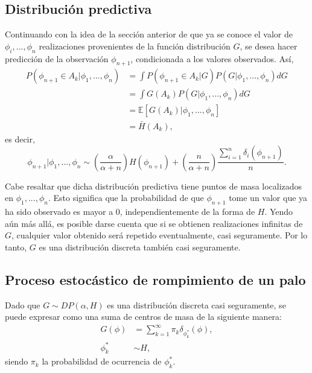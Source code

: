 \subsection{Distribuci\'on predictiva}

Continuando con la idea de la secci\'on anterior de que ya se conoce el valor de $\phi_i,...,\phi_n$ realizaciones provenientes de la funci\'on distribuci\'on $G$, se desea hacer predicci\'on de la observaci\'on $\phi_{n+1}$, condicionada a los valores observados. As\'i,
\begin{equation*}
\begin{aligned}
   P(\phi_{n+1} \in A_k|\phi_1,...,\phi_n)
   &= \int P(\phi_{n+1} \in A_k|G) P(G|\phi_1,...,\phi_n) dG \\ 
   &= \int G(A_k) P(G|\phi_1,...,\phi_n) dG \\ 
   &= \mathbb{E}[G(A_k)|\phi_1,...,\phi_n] \\
   &= \bar{H}(A_k),
\end{aligned}    
\end{equation*}
es decir, 
\begin{equation*}
    \phi_{n+1}|\phi_1,...,\phi_n \sim 
    \left(\frac{\alpha}{\alpha + n}\right)H(\phi_{n+1}) + 
    \left(\frac{n}{\alpha + n}\right)\frac{\sum_{i=1}^n \delta_i(\phi_{n+1})}{n}.
\end{equation*}

Cabe resaltar que dicha distribuci\'on predictiva tiene puntos de masa localizados en $\phi_1,...,\phi_n$. Esto significa que la probabilidad de que $\phi_{n+1}$ tome un valor que ya ha sido observado es mayor a $0$, independientemente de la forma de $H$. Yendo a\'un m\'as all\'a, es posible darse cuenta que si se obtienen realizaciones infinitas de $G$, cualquier valor obtenido ser\'a repetido eventualmente, casi seguramente. Por lo tanto, $G$ es una distribuci\'on discreta tambi\'en casi seguramente.

\subsection{Proceso estoc\'astico de rompimiento de un palo}

Dado que $G \sim DP(\alpha,H)$  es una distribuci\'on discreta casi seguramente, se puede expresar como una suma de centros de masa de la siguiente manera:
\begin{equation*}
\begin{aligned}
G(\phi) &= \sum_{k=1}^\infty \pi_k \delta_{\phi_k^*}(\phi),\\
   \phi_k^* &\sim H,
\end{aligned}
\end{equation*}
siendo $\pi_k$ la probabilidad de ocurrencia de $\phi_k^*$.

